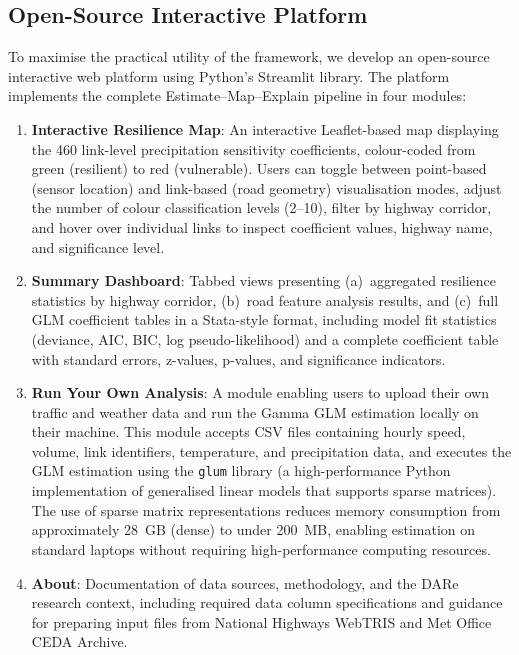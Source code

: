 \documentclass[review]{elsarticle}
\begin{document}
\subsection{Open-Source Interactive Platform}
\label{sec:method:platform}

To maximise the practical utility of the framework, we develop an open-source interactive web platform using Python's Streamlit library. The platform implements the complete Estimate--Map--Explain pipeline in four modules:

\begin{enumerate}
    \item \textbf{Interactive Resilience Map}: An interactive Leaflet-based map displaying the 460 link-level precipitation sensitivity coefficients, colour-coded from green (resilient) to red (vulnerable). Users can toggle between point-based (sensor location) and link-based (road geometry) visualisation modes, adjust the number of colour classification levels (2--10), filter by highway corridor, and hover over individual links to inspect coefficient values, highway name, and significance level.
    \item \textbf{Summary Dashboard}: Tabbed views presenting (a)~aggregated resilience statistics by highway corridor, (b)~road feature analysis results, and (c)~full GLM coefficient tables in a Stata-style format, including model fit statistics (deviance, AIC, BIC, log pseudo-likelihood) and a complete coefficient table with standard errors, z-values, p-values, and significance indicators.
    \item \textbf{Run Your Own Analysis}: A module enabling users to upload their own traffic and weather data and run the Gamma GLM estimation locally on their machine. This module accepts CSV files containing hourly speed, volume, link identifiers, temperature, and precipitation data, and executes the GLM estimation using the \texttt{glum} library (a high-performance Python implementation of generalised linear models that supports sparse matrices). The use of sparse matrix representations reduces memory consumption from approximately 28~GB (dense) to under 200~MB, enabling estimation on standard laptops without requiring high-performance computing resources.
    \item \textbf{About}: Documentation of data sources, methodology, and the DARe research context, including required data column specifications and guidance for preparing input files from National Highways WebTRIS and Met Office CEDA Archive.
\end{enumerate}
\end{document}
